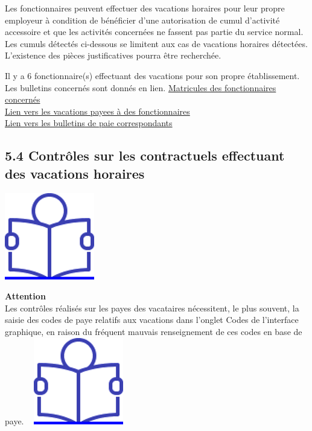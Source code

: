Les fonctionnaires peuvent effectuer des vacations horaires pour leur
propre employeur à condition de bénéficier d'une autorisation de cumul
d'activité accessoire et que les activités concernées ne fassent pas
partie du service normal. Les cumuls détectés ci-dessous se limitent aux
cas de vacations horaires détectées. L'existence des pièces
justificatives pourra être recherchée.

Il y a 6 fonctionnaire(s) effectuant des vacations pour son propre
établissement. Les bulletins concernés sont donnés en lien.
\href{../Bases/Reglementation/matricules.fonctionnaires.et.vacations.csv}{Matricules
des fonctionnaires concernés}\\
\href{../Bases/Reglementation/lignes.fonctionnaires.et.vacations.csv}{Lien
vers les vacations payees à des fonctionnaires}\\
\href{../Bases/Reglementation/Paie_vac_fonct.csv}{Lien vers les bulletins
de paie correspondants}

\hypertarget{controles-sur-les-contractuels-effectuant-des-vacations-horaires}{%
\subsection{5.4 Contrôles sur les contractuels effectuant des vacations
horaires}\label{controles-sur-les-contractuels-effectuant-des-vacations-horaires}}

\href{../Docs/Notices/fiche_CEV_droit.odt}{\includegraphics{icones/Notice.png}}

\textbf{Attention}\\
Les contrôles réalisés sur les payes des vacataires nécessitent, le plus
souvent, la saisie des codes de paye relatifs aux vacations dans
l'onglet Codes de l'interface graphique, en raison du fréquent mauvais
renseignement de ces codes en base de paye. ~
\href{../Docs/Notices/fiche_onglet_codes.odt}{\includegraphics{icones/Notice.png}}

